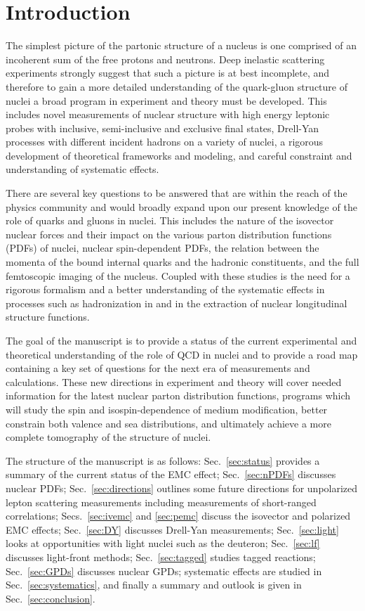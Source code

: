 \section{Introduction}

The simplest picture of the partonic structure of a nucleus is one comprised of an incoherent sum of the free protons and neutrons. Deep inelastic scattering experiments strongly suggest that such a picture is at best incomplete, and therefore to gain a more detailed understanding of the quark-gluon structure of nuclei a broad program in experiment and theory must be developed.  This includes novel measurements of nuclear structure with high energy leptonic probes with inclusive, semi-inclusive and exclusive final states, Drell-Yan processes with different incident hadrons on a variety of nuclei, a rigorous development of theoretical frameworks and modeling, and careful constraint and understanding of systematic effects.

There are several key questions to be answered that are within the reach of the physics community and would broadly expand upon our present knowledge of the role of quarks and gluons in nuclei.  This includes the nature of the isovector nuclear forces and their impact on the various parton distribution functions (PDFs) of nuclei, nuclear spin-dependent PDFs, the relation between the momenta of the bound internal quarks and the hadronic constituents, and the full femtoscopic imaging of the nucleus.  Coupled with these studies is the need for a rigorous formalism and a better understanding of the systematic effects in processes such as hadronization in and in the extraction of nuclear longitudinal structure functions. 

The goal of the manuscript is to provide a status of the current experimental and theoretical understanding of the role of QCD in nuclei and to provide a road map containing a key set of questions for the next era of measurements and calculations. These new directions in experiment and theory will cover needed information for the latest nuclear parton distribution functions, programs which will study the spin and isospin-dependence of medium modification, better constrain both valence and sea distributions, and ultimately achieve a more complete tomography of the structure of nuclei. 

The structure of the manuscript is as follows: Sec.~\ref{sec:status} provides a summary of the current status of the EMC effect; Sec.~\ref{sec:nPDFs} discusses nuclear PDFs; Sec.~\ref{sec:directions} outlines some future directions for unpolarized lepton scattering measurements including measurements of short-ranged correlations; Secs.~\ref{sec:ivemc} and \ref{sec:pemc} discuss the isovector and polarized EMC effects; Sec.~\ref{sec:DY} discusses Drell-Yan measurements; Sec.~\ref{sec:light} looks at opportunities with light nuclei such as the deuteron; Sec.~\ref{sec:lf} discusses light-front methods; Sec.~\ref{sec:tagged} studies tagged reactions; Sec.~\ref{sec:GPDs} discusses nuclear GPDs; systematic effects are studied in Sec.~\ref{sec:systematics}, and finally a summary and outlook is given in Sec.~\ref{sec:conclusion}.
